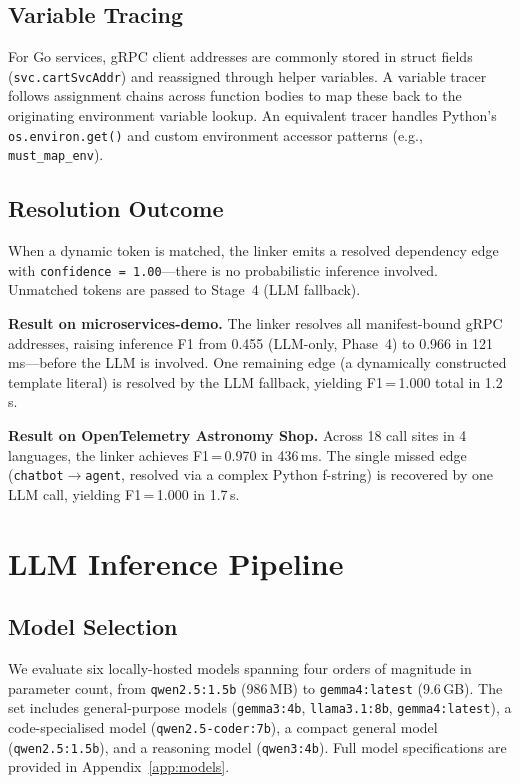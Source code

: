 \documentclass[runningheads]{llncs}
\begin{document}
\subsection{Variable Tracing}

For Go services, gRPC client addresses are commonly stored in struct fields
(\texttt{svc.cartSvcAddr}) and reassigned through helper variables. A
variable tracer follows assignment chains across function bodies to map these
back to the originating environment variable lookup. An equivalent tracer
handles Python's \texttt{os.environ.get()} and custom environment accessor
patterns (e.g., \texttt{must\_map\_env}).

\subsection{Resolution Outcome}

When a dynamic token is matched, the linker emits a resolved dependency edge
with \texttt{confidence\,=\,1.00}---there is no probabilistic inference
involved. Unmatched tokens are passed to Stage~4 (LLM fallback).

\textbf{Result on microservices-demo.} The linker resolves all
manifest-bound gRPC addresses, raising inference F1 from
0.455 (LLM-only, Phase~4) to 0.966 in 121\,ms---before the LLM is involved.
One remaining edge (a dynamically constructed template literal) is resolved
by the LLM fallback, yielding F1\,=\,1.000 total in 1.2\,s.

\textbf{Result on OpenTelemetry Astronomy Shop.} Across 18 call sites in 4
languages, the linker achieves F1\,=\,0.970 in 436\,ms. The single missed
edge (\texttt{chatbot}$\to$\texttt{agent}, resolved via a complex Python
f-string) is recovered by one LLM call, yielding F1\,=\,1.000 in 1.7\,s.

\section{LLM Inference Pipeline}
\label{sec:llm}

\subsection{Model Selection}

We evaluate six locally-hosted models spanning four orders of magnitude in
parameter count, from \texttt{qwen2.5:1.5b} (986\,MB) to
\texttt{gemma4:latest} (9.6\,GB). The set includes general-purpose models
(\texttt{gemma3:4b}, \texttt{llama3.1:8b}, \texttt{gemma4:latest}), a
code-specialised model (\texttt{qwen2.5-coder:7b}), a compact general
model (\texttt{qwen2.5:1.5b}), and a reasoning model (\texttt{qwen3:4b}).
Full model specifications are provided in Appendix~\ref{app:models}.
\end{document}
